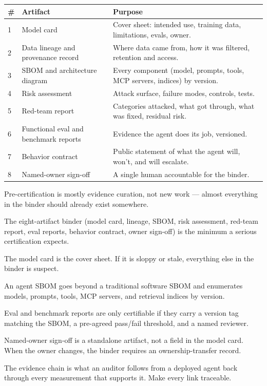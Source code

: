 \stoptwocol
\begin{center}
\small
\begin{tabularx}{\textwidth}{@{}l l X@{}}
\toprule
\textbf{\#} & \textbf{Artifact} & \textbf{Purpose} \\
\midrule
1 & Model card & Cover sheet: intended use, training data, limitations, evals, owner. \\
2 & Data lineage and provenance record & Where data came from, how it was filtered, retention and access. \\
3 & SBOM and architecture diagram & Every component (model, prompts, tools, MCP servers, indices) by version. \\
4 & Risk assessment & Attack surface, failure modes, controls, tests. \\
5 & Red-team report & Categories attacked, what got through, what was fixed, residual risk. \\
6 & Functional eval and benchmark reports & Evidence the agent does its job, versioned. \\
7 & Behavior contract & Public statement of what the agent will, won't, and will escalate. \\
8 & Named-owner sign-off & A single human accountable for the binder. \\
\bottomrule
\end{tabularx}
\end{center}
\starttwocol

\TNrule

\stoptwocol

\begin{TNkeytakeaways}
\item Pre-certification is mostly evidence curation, not new work --- almost everything in the binder should already exist somewhere.
\item The eight-artifact binder (model card, lineage, SBOM, risk assessment, red-team report, eval reports, behavior contract, owner sign-off) is the minimum a serious certification expects.
\item The model card is the cover sheet. If it is sloppy or stale, everything else in the binder is suspect.
\item An agent SBOM goes beyond a traditional software SBOM and enumerates models, prompts, tools, MCP servers, and retrieval indices by version.
\item Eval and benchmark reports are only certifiable if they carry a version tag matching the SBOM, a pre-agreed pass/fail threshold, and a named reviewer.
\item Named-owner sign-off is a standalone artifact, not a field in the model card. When the owner changes, the binder requires an ownership-transfer record.
\item The evidence chain is what an auditor follows from a deployed agent back through every measurement that supports it. Make every link traceable.
\end{TNkeytakeaways}

